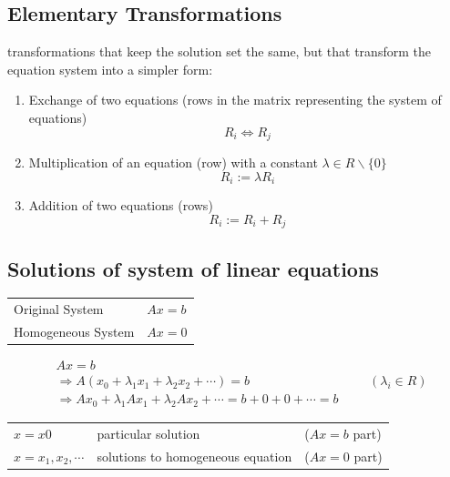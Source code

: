 \subsection{Elementary Transformations \cite{mfml-1}} \label{Elementary Transformations}
transformations that keep the solution set the same, but that transform the equation system into a simpler form:
\begin{enumerate}
    \item Exchange of two equations (rows in the matrix representing the system of equations)
    \[ R_i \Leftrightarrow R_j \]

    \item Multiplication of an equation (row) with a constant $\lambda \in R\backslash \{0\}$
    \[ R_i := \lambda R_i \]

    \item Addition of two equations (rows)
    \[ R_i := R_i + R_j \]

\end{enumerate}


\subsection{Solutions of system of linear equations \cite{mfml-1}}\label{Solutions of system of linear equations}

\begin{table}[h]
    \begin{tabular}{l l}
        Original System	& $Ax = b$ \\

        Homogeneous System & $Ax = 0$ \\
    \end{tabular}
\end{table}

\begin{align*}
   & Ax = b \\
   & \Rightarrow A(x_0 + \lambda _1x_1 + \lambda _2x_2 + \cdots ) = b	&&& (\lambda _i \in R) \\
   & \Rightarrow Ax_0 + \lambda _1Ax_1 + \lambda _2Ax_2 + \cdots  = b + 0 + 0 + \cdots  = b
\end{align*}

\begin{table}[h]
    \begin{tabular}{l l l}
        $x = x0$ & particular solution & ($Ax = b$ part) \\
        
        $x = x_1, x_2, \cdots$ & solutions to homogeneous equation & ($Ax = 0$ part)
    \end{tabular}
\end{table}


